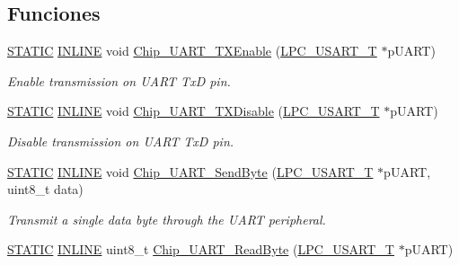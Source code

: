 \subsection*{Funciones}
\begin{DoxyCompactItemize}
\item 
\hyperlink{group___l_p_c___types___public___macros_ga10b2d890d871e1489bb02b7e70d9bdfb}{S\+T\+A\+T\+IC} \hyperlink{spifi__18xx__43xx_8h_a2eb6f9e0395b47b8d5e3eeae4fe0c116}{I\+N\+L\+I\+NE} void \hyperlink{group___u_a_r_t__18_x_x__43_x_x_ga6220ec27deb21fff77fac8fe82890ad2}{Chip\+\_\+\+U\+A\+R\+T\+\_\+\+T\+X\+Enable} (\hyperlink{struct_l_p_c___u_s_a_r_t___t}{L\+P\+C\+\_\+\+U\+S\+A\+R\+T\+\_\+T} $\ast$p\+U\+A\+RT)
\begin{DoxyCompactList}\small\item\em Enable transmission on U\+A\+RT TxD pin. \end{DoxyCompactList}\item 
\hyperlink{group___l_p_c___types___public___macros_ga10b2d890d871e1489bb02b7e70d9bdfb}{S\+T\+A\+T\+IC} \hyperlink{spifi__18xx__43xx_8h_a2eb6f9e0395b47b8d5e3eeae4fe0c116}{I\+N\+L\+I\+NE} void \hyperlink{group___u_a_r_t__18_x_x__43_x_x_ga801600ca2aa7ab55f799178867c12b96}{Chip\+\_\+\+U\+A\+R\+T\+\_\+\+T\+X\+Disable} (\hyperlink{struct_l_p_c___u_s_a_r_t___t}{L\+P\+C\+\_\+\+U\+S\+A\+R\+T\+\_\+T} $\ast$p\+U\+A\+RT)
\begin{DoxyCompactList}\small\item\em Disable transmission on U\+A\+RT TxD pin. \end{DoxyCompactList}\item 
\hyperlink{group___l_p_c___types___public___macros_ga10b2d890d871e1489bb02b7e70d9bdfb}{S\+T\+A\+T\+IC} \hyperlink{spifi__18xx__43xx_8h_a2eb6f9e0395b47b8d5e3eeae4fe0c116}{I\+N\+L\+I\+NE} void \hyperlink{group___u_a_r_t__18_x_x__43_x_x_gaa600b8621d1425b1b493238a68f38088}{Chip\+\_\+\+U\+A\+R\+T\+\_\+\+Send\+Byte} (\hyperlink{struct_l_p_c___u_s_a_r_t___t}{L\+P\+C\+\_\+\+U\+S\+A\+R\+T\+\_\+T} $\ast$p\+U\+A\+RT, uint8\+\_\+t data)
\begin{DoxyCompactList}\small\item\em Transmit a single data byte through the U\+A\+RT peripheral. \end{DoxyCompactList}\item 
\hyperlink{group___l_p_c___types___public___macros_ga10b2d890d871e1489bb02b7e70d9bdfb}{S\+T\+A\+T\+IC} \hyperlink{spifi__18xx__43xx_8h_a2eb6f9e0395b47b8d5e3eeae4fe0c116}{I\+N\+L\+I\+NE} uint8\+\_\+t \hyperlink{group___u_a_r_t__18_x_x__43_x_x_ga8eec9067080637eea7ecfedac6586fe9}{Chip\+\_\+\+U\+A\+R\+T\+\_\+\+Read\+Byte} (\hyperlink{struct_l_p_c___u_s_a_r_t___t}{L\+P\+C\+\_\+\+U\+S\+A\+R\+T\+\_\+T} $\ast$p\+U\+A\+RT)

\end{DoxyCompactItemize}
